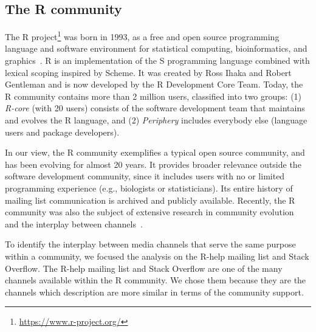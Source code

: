 \documentclass{sig-alternate-05-2015}
\begin{document}

\subsection{The R community}

	The R project\footnote{\url{https://www.r-project.org/}} was born in 1993, as a free and open source programming language and software environment for statistical computing, bioinformatics, and graphics~\cite{Ihaka1996}. 
	R is an implementation of the S programming language combined with lexical scoping inspired by Scheme. 
	It was created by Ross Ihaka and Robert Gentleman and is now developed by the R Development Core Team.
	Today, the R community contains more than 2 million users, classified into two groups: (1) \textit{R-core} (with 20 users) consists of the software development team that maintains and evolves the R language, and (2) \textit{Periphery} includes everybody else (language users and package developers).

	In our view, the R community exemplifies a typical open source community, and has been evolving for almost 20 years.
	It provides broader relevance outside the software development community, since it includes users with no or limited programming experience (e.g., biologists or statisticians). 
	Its entire history of mailing list communication is archived and publicly available.
	Recently, the R community was also the subject of extensive research in community evolution~\cite{German2013} and the interplay between channels~\cite{Vasilescu2014c}. 

	To identify the interplay between media channels that serve the same purpose within a community, we focused the analysis on the R-help mailing list and Stack Overflow.
	The R-help mailing list and Stack Overflow are one of the many channels available within the R community.
	We chose them because they are the channels which description are more similar in terms of the community support.
\end{document}

